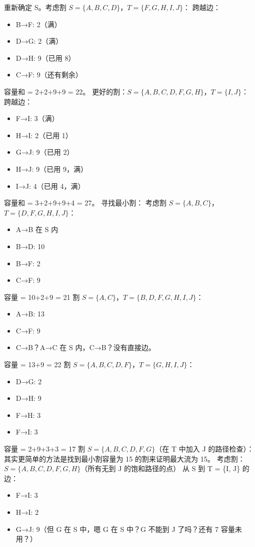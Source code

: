 \documentclass[10pt,a4paper,openany]{ctexbook}
\theoremstyle{definition}
\theoremstyle{remark}
\begin{document}
重新确定 S。考虑割 $S = \{A, B, C, D\}$，$T = \{F, G, H, I, J\}$：
跨越边：
\begin{itemize}
\item B→F: 2（满）
\item D→G: 2（满）
\item D→H: 9（已用 8）
\item C→F: 9（还有剩余）

\end{itemize}

容量和 = 2+2+9+9 = 22。
更好的割：$S = \{A, B, C, D, F, G, H\}$，$T = \{I, J\}$：
跨越边：
\begin{itemize}
\item F→I: 3（满）
\item H→I: 2（已用 1）
\item G→J: 9（已用 2）
\item H→J: 9（已用 9，满）
\item I→J: 4（已用 4，满）

\end{itemize}

容量和 = 3+2+9+9+4 = 27。
寻找最小割：
考虑割 $S = \{A, B, C\}$，$T = \{D, F, G, H, I, J\}$：
\begin{itemize}
\item A→B 在 S 内
\item B→D: 10
\item B→F: 2
\item C→F: 9
\end{itemize}

容量 = 10+2+9 = 21
割 $S = \{A, C\}$，$T = \{B, D, F, G, H, I, J\}$：
\begin{itemize}
\item A→B: 13
\item C→F: 9
\item C→B？A→C 在 S 内，C→B？没有直接边。
\end{itemize}

容量 = 13+9 = 22
割 $S = \{A, B, C, D, F\}$，$T = \{G, H, I, J\}$：
\begin{itemize}
\item D→G: 2
\item D→H: 9
\item F→H: 3
\item F→I: 3
\end{itemize}

容量 = 2+9+3+3 = 17
割 $S = \{A, B, C, D, F, G\}$（在 T 中加入 J 的路径检查）：
其实更简单的方法是找到最小割容量为 15 的割来证明最大流为 15。
考虑割：$S = \{A, B, C, D, F, G, H\}$（所有无到 J 的饱和路径的点）
从 S 到 T = \{I, J\} 的边：
\begin{itemize}
\item F→I: 3
\item H→I: 2
\item G→J: 9（但 G 在 S 中，嗯 G 在 S 中？G 不能到 J 了吗？还有 7 容量未用？）

\end{itemize}
\end{document}
